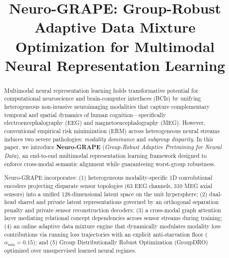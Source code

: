 \documentclass[conference]{IEEEtran}
\begin{document}
\title{Neuro-GRAPE: Group-Robust Adaptive Data Mixture Optimization for Multimodal Neural Representation Learning}

\author{
}

\maketitle

\begin{abstract}
Multimodal neural representation learning holds transformative potential for computational neuroscience and brain-computer interfaces (BCIs) by unifying heterogeneous non-invasive neuroimaging modalities that capture complementary temporal and spatial dynamics of human cognition---specifically electroencephalography (EEG) and magnetoencephalography (MEG). However, conventional empirical risk minimization (ERM) across heterogeneous neural streams induces two severe pathologies: \emph{modality dominance} and \emph{subgroup disparity}. In this paper, we introduce \textbf{Neuro-GRAPE} (\emph{Group-Robust Adaptive Pretraining for Neural Data}), an end-to-end multimodal representation learning framework designed to enforce cross-modal semantic alignment while guaranteeing worst-group robustness.

Neuro-GRAPE incorporates: (1) heterogeneous modality-specific 1D convolutional encoders projecting disparate sensor topologies (63 EEG channels, 310 MEG axial sensors) into a unified 128-dimensional latent space on the unit hypersphere; (2) dual-head shared and private latent representations governed by an orthogonal separation penalty and private sensor reconstruction decoders; (3) a cross-modal graph attention layer mediating relational concept dependencies across sensor streams during training; (4) an online adaptive data mixture engine that dynamically modulates modality loss contributions via running loss trajectories with an explicit anti-starvation floor ($\alpha_{\min} = 0.15$); and (5) Group Distributionally Robust Optimization (GroupDRO) optimized over unsupervised learned neural regimes.


\end{abstract}
\end{document}
